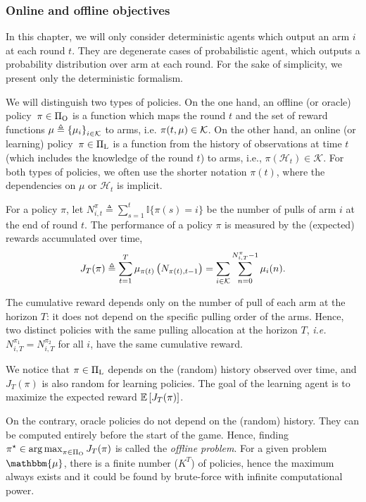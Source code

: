 \subsubsection*{Online and offline objectives}
In this chapter, we will only consider deterministic agents which output an arm $i$ at each round $t$. They are degenerate cases of probabilistic agent, which outputs a probability distribution over arm at each round. For the sake of simplicity, we present only the deterministic formalism.   

We will distinguish two types of policies. On the one hand, an offline (or oracle) policy~$\pi \in \Pi_{\rm O}$ is a function which maps the round $t$ and the set of reward functions $\mathbb{\mu} \triangleq \left\{ \mu_i \right\}_{i \in \mathcal{K}}$ to arms, i.e. $\pi(t, \mathbb{\mu}) \in \mathcal{K}$.  On the other hand, an online (or learning) policy~$\pi \in \Pi_{\rm L}$ is a function from the history of observations at time $t$ (which includes the knowledge of the round $t$) to arms, i.e., $\pi(\mathcal{H}_t) \in \mathcal{K}$. For both types of policies, we often use the shorter notation $\pi(t)$, where the dependencies on $\mu$ or $\mathcal{H}_t$ is implicit. 

For a policy $\pi$, let $N_{i,t}^\pi \triangleq \sum_{s=1}^{t} \mathbb{I}\{\pi(s) = i\}$ be the number of pulls of arm $i$ at the end of round $t$. The performance of a policy $\pi$ is measured by the (expected) rewards accumulated over time, 
%
\begin{equation}
\label{eq:cumul-reward}
J_T(\pi) \triangleq \sum_{t=1}^T \mu_{\pi(t)}\left(N_{\pi(t),t-1}\right) = \sum_{i \in \mathcal{K}} \sum_{n=0}^{N_{i,T}^\pi-1} \mu_i(n).
\end{equation}
%
\begin{remark}
\label{rem:pull-allocation}
The cumulative reward depends only on the number of pull of each arm at the horizon $T$: it does not depend on the specific pulling order of the arms. Hence, two distinct policies with the same pulling allocation at the horizon $T$, \emph{i.e.} $N_{i,T}^{\pi_1} = N_{i,T}^{\pi_2}$ for all $i$, have the same cumulative reward.
\end{remark}
%
We notice that $\pi \in \Pi_{\rm L}$ depends on the (random) history observed over time, and $J_T(\pi)$ is also random for learning policies. The goal of the learning agent is to maximize the expected reward $\mathbb{E}\left[J_T(\pi)\right]$.

On the contrary,  oracle policies do not depend on the (random) history. They can be computed entirely before the start of the game. Hence, finding $\pi^\star \in \operatorname*{arg\,max}_{\pi \in \Pi_{\rm O}} J_T(\pi)$ is called the \textit{offline problem}. For a given problem $\mathbbm{\mu}$, there is a finite number ($K^T$) of policies, hence the maximum always exists and it could be found by brute-force with infinite computational power.

